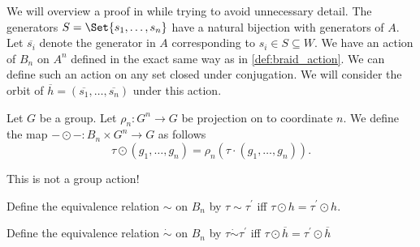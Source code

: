 We will overview a proof in \cite{resteghini_free_2024} while trying to avoid unnecessary detail.
The generators $S = \Set{s_1, \ldots , s_n} $ have a natural bijection with generators of $A$.
Let $\overline{s_i}$ denote the generator in $A$ corresponding to $s_i \in S \subseteq W$.
We have an action of $B_n$ on $A^n$ defined in the exact same way as in \cref{def:braid_action}. We can define such an action on any set closed under conjugation. We will consider the orbit of $\overline{h} = (\overline{s_1}, \ldots, \overline{s_n})$ under this action.

\begin{definition}
	Let $G$ be a group.
	Let $\rho_n \colon G^n \to G$ be projection on to coordinate $n$.
	We define the map ${-} \odot {-} \colon B_n \times G^n \to G$ as follows
	\[
		\tau \odot (g_1, \ldots, g_n) = \rho_n(\tau \cdot (g_1, \ldots, g_n))
		.\]
\end{definition}

\begin{remark}
	This is not a group action!
\end{remark}

\begin{definition}
	Define the equivalence relation $\sim$ on $B_n$ by  $\tau \sim \tau^\prime$ iff $\tau \odot h = \tau^\prime \odot h$.
\end{definition}

\begin{definition}
	Define the equivalence relation $\dot\sim$ on $B_n$ by $\tau \dot\sim \tau^\prime$ iff $\tau \odot \overline{h} = \tau^\prime \odot \overline{h}$
\end{definition}

